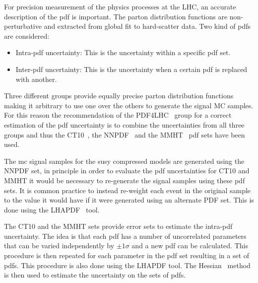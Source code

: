 For precision measurement of the physics processes at the LHC, an accurate
description of the \gls{pdf} is important. The parton distribution functions are
non-perturbative and extracted from global fit to hard-scatter data. Two kind of
\glspl{pdf} are considered:
\begin{itemize}
\item Intra-\gls{pdf} uncertainty: This is the uncertainty within a specific \gls{pdf}
  set.
\item Inter-\gls{pdf} uncertainty: This is the uncertainty when a certain
  \gls{pdf} is replaced with another.
\end{itemize}
Three different groups provide equally precise parton distribution functions
making it arbitrary to use one over the others to generate the signal MC
samples. For this reason the recommendation of the PDF4LHC~\cite{PDF4LHC} group
for a correct estimation of the \gls{pdf} uncertainty is to combine the
uncertainties from all three groups and thus the CT10~\cite{CT10}, the
NNPDF~\cite{NNPDF} and the MMHT~\cite{MMHT} \gls{pdf} sets have been used.

The \gls{mc} signal samples for the \gls{susy} compressed models are generated
using the NNPDF set, in principle in order to evaluate the \gls{pdf}
uncertainties for CT10 and MMHT it would be necessary to re-generate the signal
samples using these \gls{pdf} sets. It is common practice to instead re-weight
each event in the original sample to the value it would have if it were
generated using an alternate PDF set. This is done using the
LHAPDF~\cite{LHAPDF} tool.

The CT10 and the MMHT sets provide error sets to estimate the intra-\gls{pdf}
uncertainty. The idea is that each \gls{pdf} has a number of uncorrelated
parameters that can be varied independently by $\pm 1\sigma$ and a new \gls{pdf}
can be calculated. This procedure is then repeated for each parameter in the
\gls{pdf} set resulting in a set of \glspl{pdf}. This procedure is also done
using the LHAPDF tool. The Hessian~\cite{Hessian} method is then used to
estimate the uncertainty on the sets of \glspl{pdf}.

